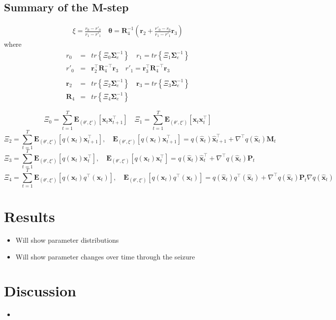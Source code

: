 \documentclass[]{article}
\begin{document}
\subsection*{Summary of the M-step}
\begin{eqnarray}
\xi=\frac{r_0-r'_0}{r_1-r'_1}
 \quad  \boldsymbol \theta=\mathbf R_4^{-1}(\mathbf r_2+\frac{r'_0-r_0}{r_1-r'_1} \mathbf r_3)
\end{eqnarray}
where
\begin{eqnarray}
 r_0&=&tr \left\lbrace  \Xi_0\boldsymbol\Sigma_e^{-1}\right\rbrace \quad r_1=tr \left\lbrace \Xi_1\boldsymbol\Sigma_e^{-1}\right\rbrace\nonumber \\
r'_0&=&\mathbf r_2^\top \mathbf R_4^{-\top}\mathbf r_3  \quad r'_1=\mathbf r_3^\top \mathbf R_4^{-\top}\mathbf r_3 \nonumber \\
\nonumber \\
 \mathbf r_2&=&tr\left\lbrace \Xi_2\boldsymbol\Sigma_e^{-1}\right\rbrace \quad \mathbf r_3= tr \left\lbrace \Xi_3\boldsymbol\Sigma_e^{-1}\right\rbrace \nonumber \\ 
 \mathbf R_4&=& tr \left\lbrace\Xi_4 \boldsymbol\Sigma_e^{-1}\right\rbrace\nonumber 
\end{eqnarray}

\begin{equation}
 \Xi_0=\sum_{t=1}^T\mathbf E_{(\theta',\xi')}[\mathbf x_t\mathbf x_{t+1}^\top] \quad \Xi_1=\sum_{t=1}^T\mathbf E_{(\theta',\xi')}[\mathbf x_t\mathbf x_t^\top]
\end{equation}
\begin{equation}
 \Xi_2=\sum_{t=1}^{T}\mathbf E_{(\theta',\xi')}[q(\mathbf x_t)\mathbf x_{t+1}^\top ], \quad \mathbf E_{(\theta',\xi')}[q(\mathbf x_t)\mathbf x_{t+1}^\top ]=q(\mathbf{ \hat x}_t)\mathbf{ \hat x}_{t+1}^\top+\nabla^\top q(\mathbf{ \hat x}_t)\mathbf M_t
\end{equation}
\begin{equation}
 \Xi_3=\sum_{t=1}^{T}\mathbf E_{(\theta',\xi')}[q(\mathbf x_t)\mathbf x_{t}^\top ], \quad \mathbf E_{(\theta',\xi')}[q(\mathbf x_t)\mathbf x_{t}^\top ]=q(\mathbf{ \hat x}_t)\mathbf{ \hat x}_{t}^\top+\nabla^\top q(\mathbf{ \hat x}_t)\mathbf P_t
\end{equation}
\begin{equation}
 \Xi_4=\sum_{t=1}^{T}\mathbf E_{(\theta',\xi')}[q(\mathbf x_t)q^\top(\mathbf x_t) ], \quad \mathbf E_{(\theta',\xi')}[q(\mathbf x_t)q^\top(\mathbf x_t) ]=q(\mathbf{ \hat x}_t)q^\top(\mathbf{ \hat x}_t)+\nabla^\top q(\mathbf{ \hat x}_t)\mathbf P_t\nabla q(\mathbf{ \hat x}_t)
\end{equation}

\section{Results}
\begin{itemize}
	\item Will show parameter distributions
	\item Will show parameter changes over time through the seizure
\end{itemize}

\section{Discussion}
\begin{itemize}
	\item  
\end{itemize}



\end{document}
